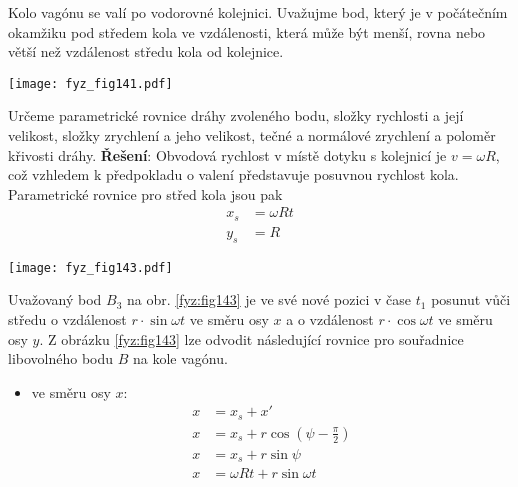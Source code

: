 \wikitextrule
\begin{example}\label{fyz:exam003}
  Kolo vagónu se valí po vodorovné kolejnici. Uvažujme bod, který je v počátečním okamžiku pod 
  středem kola ve vzdálenosti, která může být menší, rovna nebo větší než vzdálenost středu kola od 
  kolejnice.

   {\centering
    \captionsetup{type=figure}
    \texttt{[image: fyz\_fig141.pdf]}
    \label{fyz:fig141}
  \par}
  \vspace{0.5em}
  Určeme parametrické rovnice dráhy zvoleného bodu, složky rychlosti a její velikost, složky 
  zrychlení a jeho velikost, tečné a normálové zrychlení a poloměr křivosti dráhy. 
  \cite[p.~11]{Slavik}
  \vspace{1em}
  \newline
  \textbf{Řešení}: Obvodová rychlost v místě dotyku s kolejnicí je \(v=\omega R\), což vzhledem k 
  předpokladu o valení představuje posuvnou rychlost kola. Parametrické rovnice pro střed kola jsou pak
  \begin{subequations}\label{mech:eq_wheel_center}
    \begin{align}
      x_s &= \omega R t \\
      y_s &= R
    \end{align}
  \end{subequations}

   {\centering
    \captionsetup{type=figure}
    \texttt{[image: fyz\_fig143.pdf]}
    \label{fyz:fig143}
  \par}
  \vspace{0.5em}
  Uvažovaný bod \(B_3\) na obr. \ref{fyz:fig143} je ve své nové pozici v čase \(t_1\) posunut vůči 
  středu o vzdálenost \(r\cdot\sin\omega t\) ve směru osy \(x\) a o vzdálenost \(r\cdot\cos\omega 
  t\) ve směru osy \(y\). Z obrázku \ref{fyz:fig143} lze odvodit následující rovnice pro souřadnice 
  libovolného bodu \(B\) na kole vagónu.
  
           
    \begin{itemize}
      \item ve směru osy \(x\):
      \begin{align*}
        x &= x_s + x'                        \\
        x &= x_s + r\cos(\psi-\frac{\pi}{2}) \\
        x &= x_s + r\sin\psi                 \\
        x &= \omega R t + r\sin\omega t
      \end{align*}
      \end{itemize}  



\end{example}
